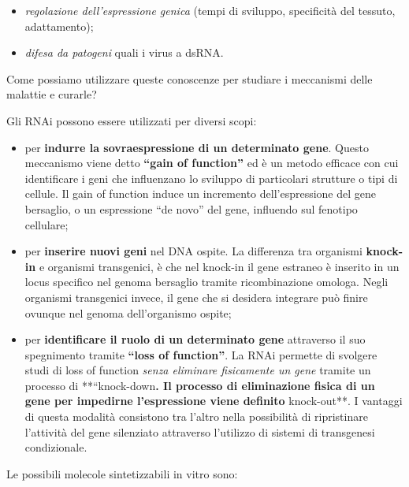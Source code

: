 \documentclass[]{article}
\begin{document}
\begin{itemize}
\itemsep1pt\parskip0pt
\item
  \emph{regolazione dell'espressione genica} (tempi di sviluppo,
  specificità del tessuto, adattamento);
\item
  \emph{difesa da patogeni} quali i virus a dsRNA.
\end{itemize}

Come possiamo utilizzare queste conoscenze per studiare i meccanismi
delle malattie e curarle?

Gli RNAi possono essere utilizzati per diversi scopi:

\begin{itemize}
\itemsep1pt\parskip0pt
\item
  per \textbf{indurre la sovraespressione di un determinato gene}.
  Questo meccanismo viene detto \textbf{``gain of function''} ed è un
  metodo efficace con cui identificare i geni che influenzano lo
  sviluppo di particolari strutture o tipi di cellule. Il gain of
  function induce un incremento dell'espressione del gene bersaglio, o
  un espressione ``de novo'' del gene, influendo sul fenotipo cellulare;
\item
  per \textbf{inserire nuovi geni} nel DNA ospite. La differenza tra
  organismi \textbf{knock-in} e organismi transgenici, è che nel
  knock-in il gene estraneo è inserito in un locus specifico nel genoma
  bersaglio tramite ricombinazione omologa. Negli organismi transgenici
  invece, il gene che si desidera integrare può finire ovunque nel
  genoma dell'organismo ospite;
\item
  per \textbf{identificare il ruolo di un determinato gene} attraverso
  il suo spegnimento tramite \textbf{``loss of function''}. La RNAi
  permette di svolgere studi di loss of function \emph{senza eliminare
  fisicamente un gene} tramite un processo di **``knock-down\textbf{. Il
  processo di eliminazione fisica di un gene per impedirne l'espressione
  viene definito }knock-out**. I vantaggi di questa modalità consistono
  tra l'altro nella possibilità di ripristinare l'attività del gene
  silenziato attraverso l'utilizzo di sistemi di transgenesi
  condizionale.
\end{itemize}

Le possibili molecole sintetizzabili in vitro sono:
\end{document}
